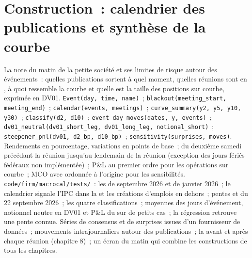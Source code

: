 \section{Construction~: calendrier des publications et synthèse de la courbe}\label{bld:m2:reading-a-macro-calendar-and-a-rates-screen:macrocal}

\begin{build}
 La note du matin de la petite société et ses limites de risque autour des événements~: quelles publications sortent à quel moment,
quelles réunions sont en , à quoi ressemble la courbe et quelle est la taille des
positions sur courbe, exprimée en DV01.
 \texttt{Event(day, time, name)}~; \texttt{blackout(meeting\_start,
meeting\_end)}~; \texttt{calendar(events, meetings)}~; \texttt{curve\_summary(y2, y5, y10,
y30)}~; \texttt{classify(d2, d10)}~; \texttt{event\_day\_moves(dates, y, events)}~;
\texttt{dv01\_neutral(dv01\_short\_leg, dv01\_long\_leg, notional\_short)}~;
\texttt{steepener\_pnl(dv01, d2\_bp, d10\_bp)}~; \texttt{sensitivity(surprises, moves)}.
 Rendements en pourcentage, variations en points de base~;  du deuxième samedi
précédant la réunion jusqu'au lendemain de la réunion (exception des jours fériés fédéraux non implémentée)~;
P\&L au premier ordre pour les opérations sur courbe~; MCO avec ordonnée à l'origine pour les sensibilités.
 \texttt{code/firm/macrocal/tests/}~: les  de septembre 2026 et de janvier
2026~; le calendrier signale l'IPC dans la  et les créations d'emplois en dehors~; pentes et
 du 22 septembre 2026~; les quatre classifications~; moyennes des jours d'événement, notionnel neutre en DV01
et P\&L du  sur de petits cas~; la régression retrouve une pente connue.
 Séries de consensus et de surprises issues d'un fournisseur de données~; mouvements intrajournaliers autour des
publications~; la  avant et après chaque réunion (chapitre 8)~; un écran du matin
qui combine les constructions de tous les chapitres.
\end{build}

